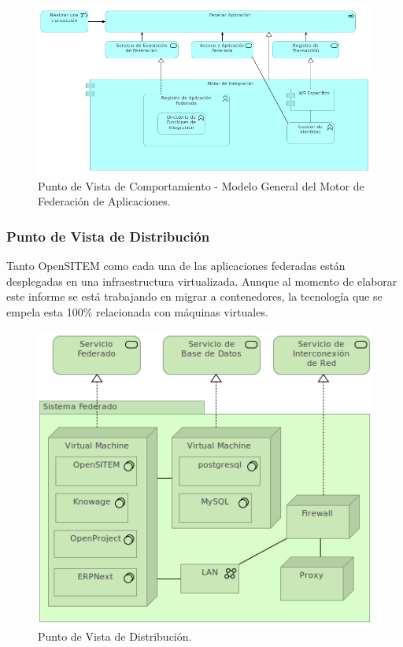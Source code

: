 \begin{figure}
 \centering
 \includegraphics[width=120mm]{motor_integracion_vista_comportamiento.png}
 \caption{Punto de Vista de Comportamiento - Modelo General del Motor de Federación de Aplicaciones.}
 \label{punto_infraestructura}
\end{figure}


\subsubsection{Punto de Vista de Distribución}

Tanto OpenSITEM como cada una de las aplicaciones federadas están desplegadas en una infraestructura virtualizada. Aunque al momento de elaborar este informe se está trabajando en migrar a contenedores, la tecnología que se empela esta 100\% relacionada con máquinas virtuales.

\begin{figure}
 \centering
 \includegraphics[width=120mm]{openSITEM_Vista_Distribucion.png}
 \caption{Punto de Vista de Distribución.}
 \label{punto_infraestructura}
\end{figure}

